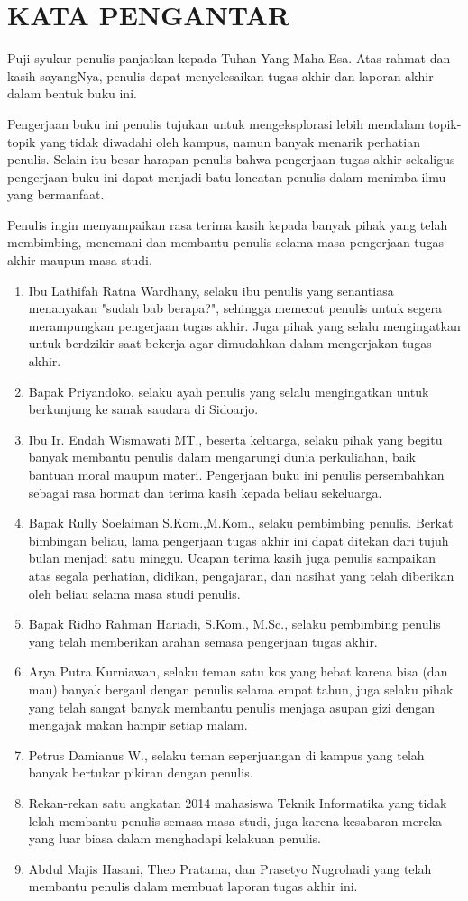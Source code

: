 \chapter {KATA PENGANTAR}

Puji syukur penulis panjatkan kepada Tuhan Yang Maha Esa. Atas rahmat dan kasih sayangNya, penulis dapat menyelesaikan tugas akhir dan laporan akhir dalam bentuk buku ini.

Pengerjaan buku ini penulis tujukan untuk mengeksplorasi lebih mendalam topik-topik yang tidak diwadahi oleh kampus, namun banyak menarik perhatian penulis. Selain itu besar harapan penulis bahwa pengerjaan tugas akhir sekaligus pengerjaan buku ini dapat menjadi batu loncatan penulis dalam menimba ilmu yang bermanfaat.

Penulis ingin menyampaikan rasa terima kasih kepada banyak pihak yang telah membimbing, menemani dan membantu penulis selama masa pengerjaan tugas akhir maupun masa studi.

\begin {enumerate}
	\item Ibu Lathifah Ratna Wardhany, selaku ibu penulis yang senantiasa menanyakan "sudah bab berapa?", sehingga memecut penulis untuk segera merampungkan pengerjaan tugas akhir. Juga pihak yang selalu mengingatkan untuk berdzikir saat bekerja agar dimudahkan dalam mengerjakan tugas akhir.
	\item Bapak Priyandoko, selaku ayah penulis yang selalu mengingatkan untuk berkunjung ke sanak saudara di Sidoarjo.
	\item Ibu Ir. Endah Wismawati MT., beserta keluarga, selaku pihak yang begitu banyak membantu penulis dalam mengarungi dunia perkuliahan, baik bantuan moral maupun materi. Pengerjaan buku ini penulis persembahkan sebagai rasa hormat dan terima kasih kepada beliau sekeluarga.
	\item Bapak Rully Soelaiman S.Kom.,M.Kom., selaku pembimbing penulis. Berkat bimbingan beliau, lama pengerjaan tugas akhir ini dapat ditekan dari tujuh bulan menjadi satu minggu. Ucapan terima kasih juga penulis sampaikan atas segala perhatian, didikan, pengajaran, dan nasihat yang telah diberikan oleh beliau selama masa studi penulis.
	\item Bapak Ridho Rahman Hariadi, S.Kom., M.Sc., selaku pembimbing penulis yang telah memberikan arahan semasa pengerjaan tugas akhir.
	\item Arya Putra Kurniawan, selaku teman satu kos yang hebat karena bisa (dan mau) banyak bergaul dengan penulis selama empat tahun, juga selaku pihak yang telah sangat banyak membantu penulis menjaga asupan gizi dengan mengajak makan hampir setiap malam.
	\item Petrus Damianus W., selaku teman seperjuangan di kampus yang telah banyak bertukar pikiran dengan penulis.
	\item Rekan-rekan satu angkatan 2014 mahasiswa Teknik Informatika yang tidak lelah membantu penulis semasa masa studi, juga karena kesabaran mereka yang luar biasa dalam menghadapi kelakuan penulis.
	\item Abdul Majis Hasani, Theo Pratama, dan Prasetyo Nugrohadi yang telah membantu penulis dalam membuat laporan tugas akhir ini.
\end {enumerate}

